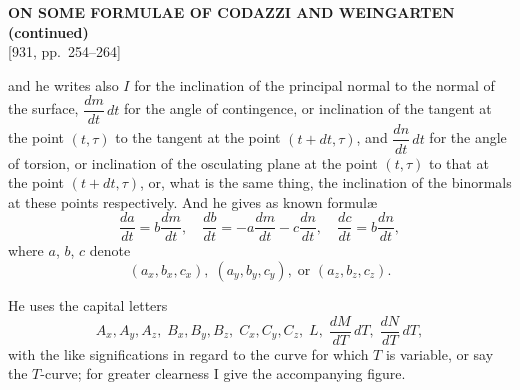 \documentclass[11pt]{article}
\begin{document}
\begin{center}
{\large\bfseries ON SOME FORMULAE OF CODAZZI AND WEINGARTEN (continued)}\\[0.4em]
{\small [931, pp.\ 254--264]}
\end{center}
\vspace{0.4em}

and he writes also $I$ for the inclination of the principal normal to the normal of the surface, $\dfrac{dm}{dt}\,dt$ for the angle of contingence, or inclination of the tangent at the point $(t,\tau)$ to the tangent at the point $(t+dt,\tau)$, and $\dfrac{dn}{dt}\,dt$ for the angle of torsion, or inclination of the osculating plane at the point $(t,\tau)$ to that at the point $(t+dt,\tau)$, or, what is the same thing, the inclination of the binormals at these points respectively. And he gives as known formul\ae{}
\[
\frac{da}{dt}=b\frac{dm}{dt},\quad \frac{db}{dt}=-a\frac{dm}{dt}-c\frac{dn}{dt},\quad \frac{dc}{dt}=b\frac{dn}{dt},
\]
where $a$, $b$, $c$ denote
\[
(a_x, b_x, c_x),\; (a_y, b_y, c_y),\; \text{or } (a_z, b_z, c_z).
\]

He uses the capital letters
\[
A_x, A_y, A_z,\; B_x, B_y, B_z,\; C_x, C_y, C_z,\; L,\; \frac{dM}{dT}\,dT,\; \frac{dN}{dT}\,dT,
\]
with the like significations in regard to the curve for which $T$ is variable, or say the $T$-curve; for greater clearness I give the accompanying figure.
\end{document}
